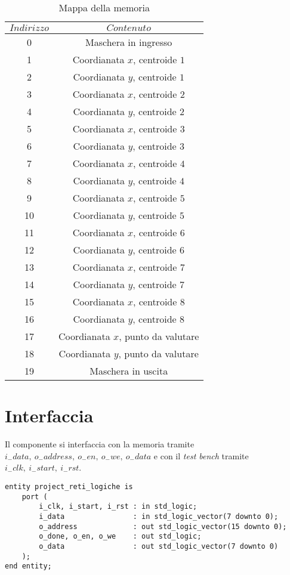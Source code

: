 \documentclass[a4paper]{report}
\begin{document}
\begin{center}
\begin{table}[H]
    \centering
    \begin{tabular}{|c||c|}
        \hline
        $Indirizzo$&$Contenuto$\\
        \hline
        0&Maschera in ingresso\\
        1&Coordianata $x$, centroide $1$\\
        2&Coordianata $y$, centroide $1$\\
        3&Coordianata $x$, centroide $2$\\
        4&Coordianata $y$, centroide $2$\\
        5&Coordianata $x$, centroide $3$\\
        6&Coordianata $y$, centroide $3$\\
        7&Coordianata $x$, centroide $4$\\
        8&Coordianata $y$, centroide $4$\\
        9&Coordianata $x$, centroide $5$\\
        10&Coordianata $y$, centroide $5$\\
        11&Coordianata $x$, centroide $6$\\
        12&Coordianata $y$, centroide $6$\\
        13&Coordianata $x$, centroide $7$\\
        14&Coordianata $y$, centroide $7$\\
        15&Coordianata $x$, centroide $8$\\
        16&Coordianata $y$, centroide $8$\\
        17&Coordianata $x$, punto da valutare\\
        18&Coordianata $y$, punto da valutare\\
        19&Maschera in uscita\\
        \hline
    \end{tabular}
    \caption{Mappa della memoria}
\end{table}
\end{center}

\section{Interfaccia}
Il componente si interfaccia con la memoria tramite $i_-data,\ o_-address,\ o_-en,\ o_-we,\ o_-data$ e con il {\it test bench} tramite $i_-clk,\ i_-start,\ i_-rst$.
\begin{verbatim}
entity project_reti_logiche is
    port (
        i_clk, i_start, i_rst : in std_logic;
        i_data                : in std_logic_vector(7 downto 0);
        o_address             : out std_logic_vector(15 downto 0);
        o_done, o_en, o_we    : out std_logic;
        o_data                : out std_logic_vector(7 downto 0)
    );
end entity;
\end{verbatim}
\end{document}
